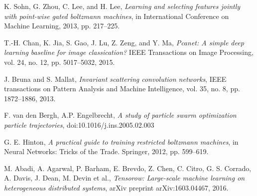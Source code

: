 \documentclass[conference]{IEEEtran}
\begin{document}
\begin{thebibliography}{}
K. Sohn, G. Zhou, C. Lee, and H. Lee, \emph{Learning and selecting features jointly with point-wise gated boltzmann machines}, in International Conference on Machine Learning, 2013, pp. 217–225.

T.-H. Chan, K. Jia, S. Gao, J. Lu, Z. Zeng, and Y. Ma, \emph{Pcanet: A simple deep learning baseline for image classication?} IEEE Transactions on Image Processing, vol. 24, no. 12, pp. 5017–5032, 2015.

J. Bruna and S. Mallat, \emph{Invariant scattering convolution networks}, IEEE transactions on Pattern Analysis and Machine Intelligence, vol. 35, no. 8, pp. 1872–1886, 2013.

F. van den Bergh, A.P. Engelbrecht, \emph{A study of particle swarm optimization particle trajectories}, doi:10.1016/j.ins.2005.02.003

G. E. Hinton, \emph{A practical guide to training restricted boltzmann machines}, in Neural Networks: Tricks of the Trade. Springer, 2012, pp. 599–619.

M. Abadi, A. Agarwal, P. Barham, E. Brevdo, Z. Chen, C. Citro, G. S. Corrado, A. Davis, J. Dean, M. Devin et al., \emph{Tensorow: Large-scale machine learning on heterogeneous distributed systems}, arXiv preprint arXiv:1603.04467, 2016.

\end{thebibliography}
\end{document}

